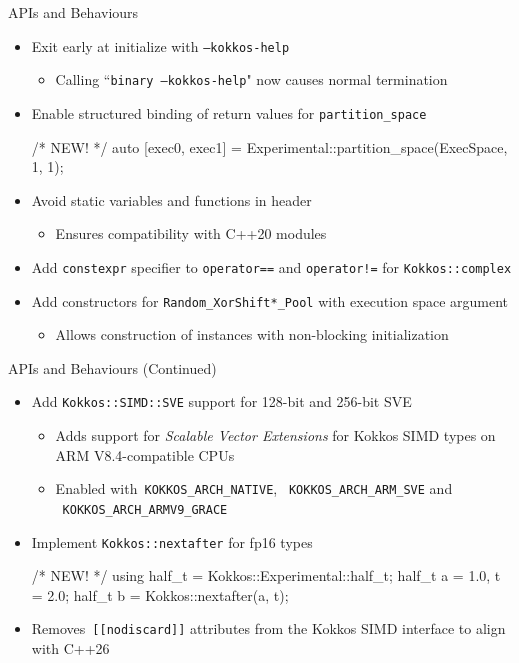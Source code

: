 \begin{frame}[fragile]{APIs and Behaviours}
 \begin{itemize}
   \item Exit early at initialize with \texttt{--kokkos-help}
    \begin{itemize}
      \item Calling ``\texttt{binary --kokkos-help}" now causes normal termination
   \end{itemize}  
   \item Enable structured binding of return values for \texttt{partition\_space}
        \begin{code}[keywords={std}]
          /* NEW! */
          auto [exec0, exec1] = 
                  Experimental::partition_space(ExecSpace, 1, 1);
        \end{code}
    \item Avoid static variables and functions in header
    \begin{itemize}
      \item  Ensures compatibility with C++20 modules
      \end{itemize}
    \item Add \texttt{constexpr} specifier to \texttt{operator==} and \texttt{operator!=} for \texttt{Kokkos::complex}
    \item Add constructors for \texttt{Random\_XorShift*\_Pool} with execution space argument
      \begin{itemize}
      \item Allows construction of instances with non-blocking initialization
    \end{itemize}

 \end{itemize}
\end{frame}

\begin{frame}[fragile]{APIs and Behaviours (Continued)}
 \begin{itemize}
     \item Add \texttt{Kokkos::SIMD::SVE} support for 128-bit and 256-bit SVE 
     \begin{itemize}
      \item Adds support for \emph{Scalable Vector Extensions} for Kokkos SIMD types on ARM V8.4-compatible CPUs
      \item Enabled with~\texttt{KOKKOS\_ARCH\_NATIVE}, ~\texttt{KOKKOS\_ARCH\_ARM\_SVE} and
 ~\texttt{KOKKOS\_ARCH\_ARMV9\_GRACE}
     \end{itemize}
     \item Implement \texttt{Kokkos::nextafter} for fp16 types
        \begin{code}[keywords={std}]
          /* NEW! */
          using half_t = Kokkos::Experimental::half_t;
          half_t a = 1.0, t = 2.0;
          half_t b = Kokkos::nextafter(a, t);
        \end{code}
        \item Removes~\texttt{[[nodiscard]]} attributes from the Kokkos SIMD interface to align with C++26
 \end{itemize}
\end{frame}


